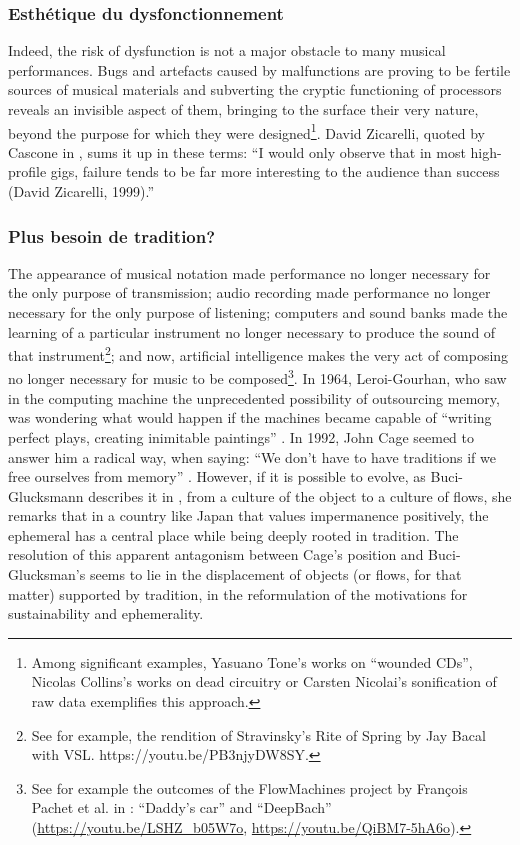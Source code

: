 \subsubsection{Esthétique du dysfonctionnement}
Indeed, the risk of dysfunction is not a major obstacle to many musical performances. Bugs and artefacts caused by malfunctions are proving to be fertile sources of musical materials and subverting the cryptic functioning of processors reveals an invisible aspect of them, bringing to the surface their very nature, beyond the purpose for which they were designed\footnote{Among significant examples, Yasuano Tone's works on “wounded CDs”, Nicolas Collins's works on dead circuitry or Carsten Nicolai's sonification of raw data exemplifies this approach.}. David Zicarelli, quoted by Cascone in \cite{cascone_aesthetics_2000}, sums it up in these terms: “I would only observe that in most high-profile gigs, failure tends to be far more interesting to the audience than success (David Zicarelli, 1999).”

\subsubsection{Plus besoin de tradition?}
The appearance of musical notation made performance no longer necessary for the only purpose of transmission; audio recording made performance no longer necessary for the only purpose of listening; computers and sound banks made the learning of a particular instrument no longer necessary to produce the sound of that instrument\footnote{See for example, the rendition of Stravinsky's Rite of Spring by Jay Bacal with VSL. https://youtu.be/PB3njyDW8SY.}; and now, artificial intelligence makes the very act of composing no longer necessary for music to be composed\footnote{See for example the outcomes of the FlowMachines project by François Pachet et al. in \cite{hadjeres_deepbach:_2016}: “Daddy's car” and “DeepBach” (\url{https://youtu.be/LSHZ_b05W7o}, \url{https://youtu.be/QiBM7-5hA6o}).}.
	In 1964, Leroi-Gourhan, who saw in the computing machine the unprecedented possibility of outsourcing memory, was wondering what would happen if the machines became capable of “writing perfect plays, creating inimitable paintings” \cite{gourhan_geste_1964}. In 1992, John Cage seemed to answer him a radical way, when saying: “We don't have to have traditions if we free ourselves from memory” \cite{sebestik_ecoute_1992}. 
	However, if it is possible to evolve, as Buci-Glucksmann describes it in \cite{buci-glucksmann_esthetique_2003}, from a culture of the object to a culture of flows, she remarks that in a country like Japan that values impermanence positively, the ephemeral has a central place while being deeply rooted in tradition.	
	The resolution of this apparent antagonism between Cage's position and Buci-Glucksman's seems to lie in the displacement of objects (or flows, for that matter) supported by tradition, in the reformulation of the motivations for sustainability and ephemerality.


